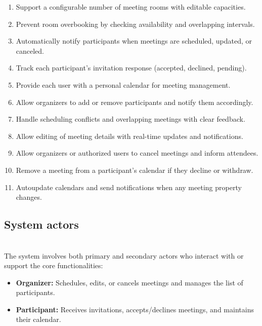 \begin{enumerate}
\item
\protect{}\label{8tpq12r4RtkWyzKvfmz48}
Support a configurable number of meeting rooms with editable capacities.
\item
\protect{}\label{FFGlwFWlsUSCO4BRkYR8v}
Prevent room overbooking by checking availability and overlapping intervals.
\item
\protect{}\label{X_yfvyZRUYMS2mXhGCwW8}
Automatically notify participants when meetings are scheduled, updated, or canceled.
\item
\protect{}\label{BxVWsHrSJ3YHDm--YvCO9}
Track each participant's invitation response (accepted, declined, pending).
\item
\protect{}\label{Zbg7NhPtMEG16-CR5MU5L}
Provide each user with a personal calendar for meeting management.
\item
\protect{}\label{8tJX5Ri3G2CDDPhNdznqm}
Allow organizers to add or remove participants and notify them accordingly.
\item
\protect{}\label{l3KYYSTiBgXmRqihTWLTy}
Handle scheduling conflicts and overlapping meetings with clear feedback.
\item
\protect{}\label{B0XnuUnV7qIgTihY_5gIO}
Allow editing of meeting details with real-time updates and notifications.
\item
\protect{}\label{LoIxK-T-bXFUfFDrHtViN}
Allow organizers or authorized users to cancel meetings and inform attendees.
\item
\protect{}\label{oVY1Y_NqhTmy8pR8xTuQ7}
Remove a meeting from a participant's calendar if they decline or withdraw.
\item
\protect{}\label{w65QiVxfKI-dKBWmRG8r2}
Autoupdate calendars and send notifications when any meeting property changes.
\end{enumerate}

\subsection{System actors}\label{Nv3ea0K348OIzNj7aBQUQ}
\\
The system involves both primary and secondary actors who interact with or support the core functionalities:

\begin{itemize}
\item
\protect{}\label{SV3WAYGhADAqHfAU6PakD}
\textbf{Organizer:} Schedules, edits, or cancels meetings and manages the list of participants.
\item
\protect{}\label{-uad9sv99mQA2ynWqmZvS}
\textbf{Participant:} Receives invitations, accepts/declines meetings, and maintains their calendar.
\end{itemize}

